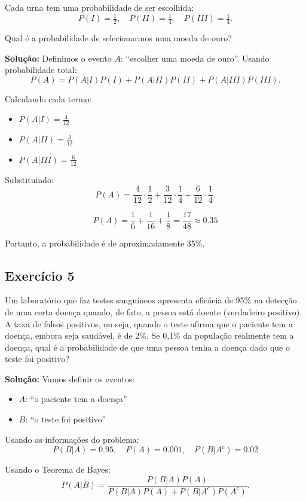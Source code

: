 \documentclass{article}
\begin{document}
Cada urna tem uma probabilidade de ser escolhida:
    $$
    P(I) = \tfrac{1}{2}, \quad P(II) = \tfrac{1}{4}, \quad P(III) = \tfrac{1}{4}.
    $$

Qual é a probabilidade de selecionarmos uma moeda de ouro?

\vspace{0.5cm}
\textbf{Solução:}
Definimos o evento $A$: ``escolher uma moeda de ouro''.  
Usando probabilidade total:
    $$
    P(A) = P(A|I)P(I) + P(A|II)P(II) + P(A|III)P(III).
    $$

Calculando cada termo:  
\begin{itemize}
    \item $P(A|I) = \tfrac{4}{12}$  
    \item $P(A|II) = \tfrac{3}{12}$  
    \item $P(A|III) = \tfrac{6}{12}$  
\end{itemize}

Substituindo:
    $$
    P(A) = \frac{4}{12}\cdot \frac{1}{2} + \frac{3}{12}\cdot \frac{1}{4} + \frac{6}{12}\cdot \frac{1}{4}.
    $$
    
    $$
    P(A) = \frac{1}{6} + \frac{1}{16} + \frac{1}{8} = \frac{17}{48} \approx 0.35
    $$

Portanto, a probabilidade é de aproximadamente 35\%.

\subsection{Exercício 5}
Um laboratório que faz testes sanguíneos apresenta eficácia de 95\% na detecção de uma certa doença quando, de fato, a pessoa está doente (verdadeiro positivo).  
A taxa de falsos positivos, ou seja, quando o teste afirma que o paciente tem a doença, embora seja saudável, é de 2\%.  
Se 0,1\% da população realmente tem a doença, qual é a probabilidade de que uma pessoa tenha a doença dado que o teste foi positivo?

\vspace{0.5cm}
\textbf{Solução:}
Vamos definir os eventos:  
\begin{itemize}
    \item $A$: ``o paciente tem a doença''  
    \item $B$: ``o teste foi positivo''  
\end{itemize}

Usando as informações do problema:
    $$
    P(B|A) = 0.95, 
    \quad P(A) = 0.001,
    \quad P(B|A^c) = 0.02
    $$

Usando o Teorema de Bayes:
    $$
    P(A|B) = \frac{P(B|A)P(A)}{P(B|A)P(A) + P(B|A^c)P(A^c)}.
    $$
\end{document}
